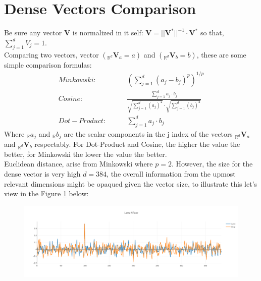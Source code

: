 \documentclass[a4paper,fleqn]{cas-sc}
\begin{document}
\section{Dense Vectors Comparison}
Be sure any vector $\mathbf{V}$ is normalized in it self: 
$\mathbf{V}=||{\mathbf{V}^{*}}||^{-1}\cdot{}\mathbf{V}^{*}$ so that, $\sum_{j=1}^{d}V_{j}=1$.\\
Comparing two vectors, vector $({}_{\mathbb{R}^{d}}\mathbf{V}_{a}=a)$ and $({}_{\mathbb{R}^{d}}\mathbf{V}_{b}=b)$, 
these are some simple comparison formulas: 
\begin{equation}
\begin{split}
  Minkowski: & \hspace{25pt} \left(\sum_{j=1}^{d}(a_{j}-b_{j})^p\right)^{1/p} \\
  Cosine: & \hspace{25pt} \frac{\sum_{j=1}^{d}a_{j}\cdot{}b_{j}}{\sqrt{\sum_{j=1}^{d}(a_{j})^2}\cdot{}\sqrt{\sum_{j=1}^{d}(b_{j})^2}} \\
  Dot-Product: &\hspace{25pt} \sum_{j=1}^{d}a_{j}\cdot{}b_{j}
\end{split}
\end{equation}
Where ${}_{\mathbb{R}}a_{j}$ and ${}_{\mathbb{R}}b_{j}$ are the scalar components in the j index of the vectors 
$_{\mathbb{R}^{d}}\mathbf{V}_{a}$ and $_{\mathbb{R}^{d}}\mathbf{V}_{b}$ respectably. For Dot-Product and Cosine, 
the higher the value the better, for Minkowski the lower the value the better. \\
Euclidean distance, arise from Minkowski where $p=2$. However, the size for the dense vector is very high $d=384$, 
the overall information from the upmost relevant dimensions might be opaqued given the vector size, 
to illustrate this let's view in the Figure \ref{fig1} below: \\

\begin{figure}[!h]
  \includegraphics[width=\textwidth,height=\textheight,keepaspectratio]{./images/love_fear}
  \label{fig1}
\end{figure}
\end{document}

